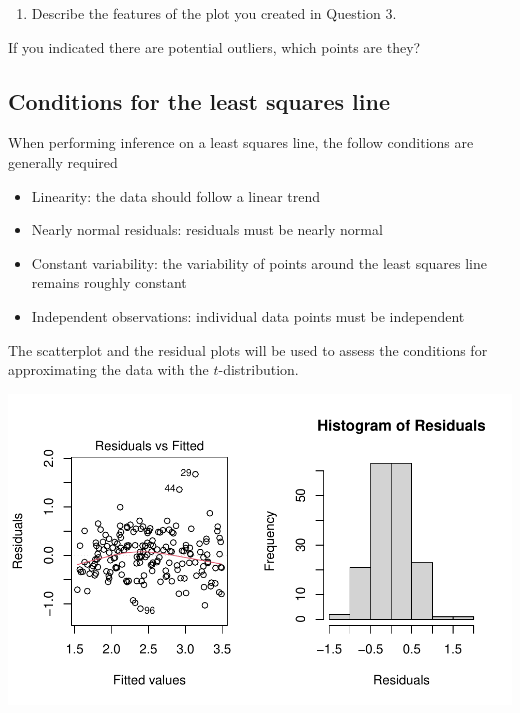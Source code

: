 \documentclass[
]{report}
\providecommand{\tightlist}{%
  \setlength{\itemsep}{0pt}\setlength{\parskip}{0pt}}
\begin{document}
\vspace{2in}

\begin{enumerate}
\def\labelenumi{\arabic{enumi}.}
\setcounter{enumi}{3}
\tightlist
\item
  Describe the features of the plot you created in Question 3.
\end{enumerate}

\vspace{1in}

If you indicated there are potential outliers, which points are they?

\vspace{0.5in}

\hypertarget{conditions-for-the-least-squares-line}{%
\subsection{Conditions for the least squares line}\label{conditions-for-the-least-squares-line}}

When performing inference on a least squares line, the follow conditions are generally required

\begin{itemize}
\tightlist
\item
  Linearity: the data should follow a linear trend
\item
  Nearly normal residuals: residuals must be nearly normal
\item
  Constant variability: the variability of points around the least squares line remains roughly constant
\item
  Independent observations: individual data points must be independent
\end{itemize}

The scatterplot and the residual plots will be used to assess the conditions for approximating the data with the \(t\)-distribution.

\begin{center}\includegraphics[width=0.7\linewidth]{10-regression_files/figure-latex/unnamed-chunk-3-1} \end{center}
\end{document}
